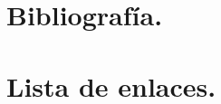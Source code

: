 \documentclass[10pt,a4paper]{book}
\begin{document}
\section{Bibliografía.}\label{bibliografia}


\section{Lista de enlaces.}


\backmatter

\printindex

\pagebreak
\thispagestyle{empty}
\mbox{}

\newpage
\thispagestyle{empty}
\mbox{  }
\end{document}
